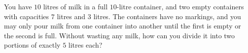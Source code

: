 You have $10$ litres of milk in a full $10$-litre container, and two empty containers with capacities $7$ litres and $3$ litres. The containers have no markings, and you may only pour milk from one container into another until the first is empty or the second is full. Without wasting any milk, how can you divide it into two portions of exactly $5$ litres each?
